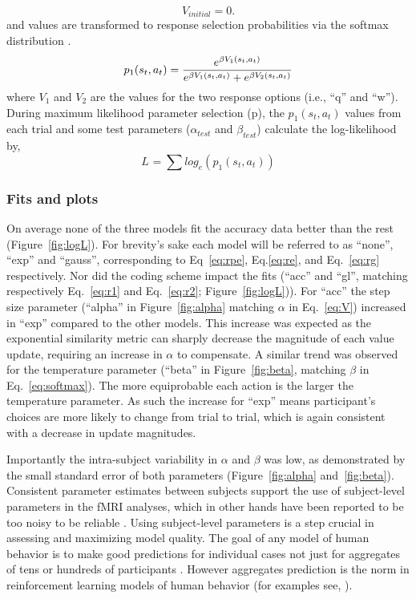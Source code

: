 \begin{equation} \label{eq:V0} V_{initial} = 0. \end{equation}
and values are transformed to response selection probabilities via the softmax distribution \cite{Sutton:1998p9247,ODoherty:2003p6329}.
\begin{equation}
    \label{eq:softmax}
    p_1(s_t,a_t) = {e^{\beta V_1(s_t,a_t)}\over{e^{\beta V_1(s_t,a_t)} + e^{\beta V_2(s_t,a_t)}}}
\end{equation}
where $V_1$ and $V_2$ are the values for the two response options (i.e., ``q'' and ``w'').
During maximum likelihood parameter selection (p\pageref{subsub:codesandfits}), the $p_1(s_t,a_t)$ values from each trial and some test parameters ($\alpha_{test}$ and $\beta_{test}$) calculate the log-likelihood by,
\begin{equation}
    \label{eq:logL}
    L_{} = \sum{log_e(p_1(s_t,a_t))}
\end{equation}

\subsubsection{Fits and plots}
\label{subsub:fits}
On average none of the three models fit the accuracy data better than the rest (Figure~\ref{fig:logL}).  For brevity's sake each model will be referred to as ``none'', ``exp'' and ``gauss'', corresponding to Eq~\ref{eq:rpe}, Eq.\ref{eq:re}, and Eq.~\ref{eq:rg} respectively.  Nor did the coding scheme impact the fits (``acc'' and ``gl'', matching respectively Eq.~\ref{eq:r1} and Eq.~\ref{eq:r2}; Figure~\ref{fig:logL})).  For ``acc'' the step size parameter (``alpha'' in Figure~\ref{fig:alpha} matching $\alpha$ in Eq.~\ref{eq:V}) increased in ``exp'' compared to the other models.  This increase was expected as the exponential similarity metric can sharply decrease the magnitude of each value update, requiring an increase in $\alpha$ to compensate.  A similar trend was observed for the temperature parameter (``beta'' in Figure~\ref{fig:beta}, matching $\beta$ in Eq.~\ref{eq:softmax}). The more equiprobable each action is the larger the temperature parameter.  As such the increase for ``exp'' means participant's choices are more likely to change from trial to trial, which is again consistent with a decrease in update magnitudes.

Importantly the intra-subject variability in $\alpha$ and $\beta$ was low, as demonstrated by the small standard error of both parameters (Figure~\ref{fig:alpha} and~\ref{fig:beta}).  Consistent parameter estimates between subjects support the use of subject-level parameters in the fMRI analyses, which in other hands have been reported to be too noisy to be reliable \cite{Daw:2011p7995,Seymour:2007p7585,ODoherty:2003p6329}.  Using subject-level parameters is a step crucial in assessing and maximizing model quality. The goal of any model of human behavior is to make good predictions for individual cases not just for aggregates of tens or hundreds of participants \cite{Daw:2007p9346}.  However aggregates prediction is the norm in reinforcement learning models of human behavior (for examples see, ).

